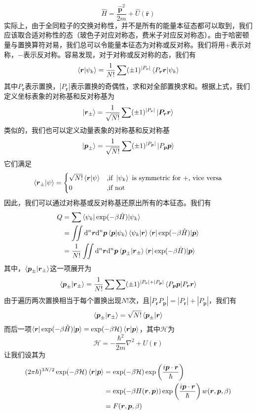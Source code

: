 \documentclass[hyperref,UTF8]{ctexbook}
\newcommand{\bm}[1]{\boldsymbol{#1}}
\begin{document}
\[\hat{H}=\frac{\hat{\bm{p}}^2}{2m}+\hat{U}(\hat{\bm{r}})\]
\indent 实际上，由于全同粒子的交换对称性，并不是所有的能量本征态都可以取到，我们应该取合适对称性的态（玻色子对应对称态，费米子对应反对称态）。由于哈密顿量与置换算符对易，我们总可以令能量本征态为对称或反对称。我们将用$+$表示对称，$-$表示反对称。容易发现，对于对称或反对称的态，我们有
\[\braket{\bm{r}|\psi_k}=\frac{1}{N!}\sum(\pm1)^{|P_{\bm{r}}|}\braket{P_{\bm{r}}\bm{r}|\psi_k}\]
其中$P_{\bm{r}}$表示置换，$|P_{\bm{r}}|$表示置换的奇偶性，求和对全部置换求和。根据上式，我们定义坐标表象的对称基和反对称基为
\[\ket{\bm{r}_{\pm}}=\frac{1}{\sqrt{N!}}\sum(\pm1)^{|P_{\bm{r}}|}\ket{\bm{P_{\bm{r}}r}}\]
类似的，我们也可以定义动量表象的对称基和反对称基
\[\ket{\bm{p}_{\pm}}=\frac{1}{\sqrt{N!}}\sum(\pm1)^{|P_{\bm{p}}|}\ket{P_{\bm{p}}\bm{p}}\]
它们满足
\[\braket{\bm{r}_\pm|\psi}=\begin{cases}
	\sqrt{N!}\braket{\bm{r}|\psi}&\text{,if }\ket{\psi_k}\text{ is symmetric for +, vice versa}\\
	0&\text{,if not}
\end{cases}\]
\indent 因此，我们可以通过对称基或反对称基还原出所有的本征态。我们有
\begin{align*}
	Q&=\sum\braket{\psi_k|\exp(-\beta\hat{H})|\psi_k}\\
	&=\iint\mathrm{d}^n\bm{r}\mathrm{d}^n\bm{p}\braket{\bm{p}|\psi_k}\braket{\psi_k|\bm{r}}\braket{\bm{r}|\exp(-\beta\hat{H})|\bm{p}}\\
	&=\frac{1}{N!}\iint\mathrm{d}^n\bm{r}\mathrm{d}^n\bm{p}\braket{\bm{p}_\pm|\bm{r}_\pm}\braket{\bm{r}|\exp(-\beta\hat{H})|\bm{p}}
\end{align*}
其中，$\braket{\bm{p}_\pm|\bm{r}_\pm}$这一项展开为
\[\braket{\bm{p}_\pm|\bm{r}_\pm}=\frac{1}{N!}\sum\sum(\pm1)^{|P_{\bm{r}}|+|P_{\bm{p}}|}\braket{P_{\bm{p}}\bm{p}|P_{\bm{r}}\bm{r}}\]
由于遍历两次置换相当于每个置换出现$N!$次，且$|P_{\bm{r}}P_{\bm{p}}|=|P_{\bm{r}}|+|P_{\bm{p}}|$，我们有
\[\braket{\bm{p}_\pm|\bm{r}_\pm}=\sqrt{N!}\braket{\bm{p}_\pm|\bm{r}}\]
而后一项$\braket{\bm{r}|\exp(-\beta\hat{H})|\bm{p}}=\exp(-\beta\mathcal{H})\braket{\bm{r}|\bm{p}}$，其中$\mathcal{H}$为
\[\mathcal{H}=-\frac{\hbar^2}{2m}\nabla^2+U(\bm{r})\]
让我们设其为
\begin{align*}
	(2\pi\hbar)^{3N/2}\exp(-\beta\mathcal{H})\braket{\bm{r}|\bm{p}}&=\exp(-\beta\mathcal{H})\exp\left(\frac{i\bm{p}\cdot\bm{r}}{\hbar}\right)\\
	&=\exp(-\beta H(\bm{r},\bm{p}))\exp\left(\frac{i\bm{p}\cdot\bm{r}}{\hbar}\right)w(\bm{r},\bm{p},\beta)\\
	&=F(\bm{r},\bm{p},\beta)
\end{align*}
\end{document}
